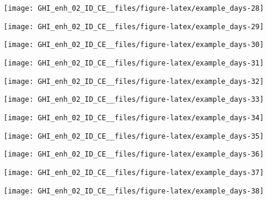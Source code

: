 \documentclass[
  10pt,
  a4paper,oneside]{article}
\begin{document}
\begin{center}\texttt{[image: GHI\_enh\_02\_ID\_CE\_\_files/figure-latex/example\_days-28]} \end{center}

\begin{center}\texttt{[image: GHI\_enh\_02\_ID\_CE\_\_files/figure-latex/example\_days-29]} \end{center}

\begin{center}\texttt{[image: GHI\_enh\_02\_ID\_CE\_\_files/figure-latex/example\_days-30]} \end{center}

\begin{center}\texttt{[image: GHI\_enh\_02\_ID\_CE\_\_files/figure-latex/example\_days-31]} \end{center}

\begin{center}\texttt{[image: GHI\_enh\_02\_ID\_CE\_\_files/figure-latex/example\_days-32]} \end{center}

\begin{center}\texttt{[image: GHI\_enh\_02\_ID\_CE\_\_files/figure-latex/example\_days-33]} \end{center}

\begin{center}\texttt{[image: GHI\_enh\_02\_ID\_CE\_\_files/figure-latex/example\_days-34]} \end{center}

\begin{center}\texttt{[image: GHI\_enh\_02\_ID\_CE\_\_files/figure-latex/example\_days-35]} \end{center}

\begin{center}\texttt{[image: GHI\_enh\_02\_ID\_CE\_\_files/figure-latex/example\_days-36]} \end{center}

\begin{center}\texttt{[image: GHI\_enh\_02\_ID\_CE\_\_files/figure-latex/example\_days-37]} \end{center}

\begin{center}\texttt{[image: GHI\_enh\_02\_ID\_CE\_\_files/figure-latex/example\_days-38]} \end{center}
\end{document}
